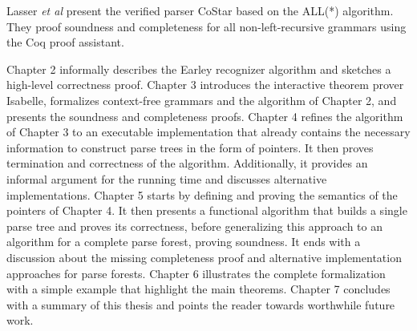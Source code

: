 \begin{isabellebody}
\begin{isamarkuptext}
Lasser \textit{et al} \cite{Lasser:2021} present the verified parser CoStar based on the ALL(*) algorithm.
They proof soundness and completeness for all non-left-recursive grammars using the Coq proof assistant.%
\end{isamarkuptext}\isamarkuptrue%
%
\isadelimdocument
%
\endisadelimdocument
%
\isatagdocument
%
\isamarkuptrue%
%
\endisatagdocument
{\isafolddocument}%
%
\isadelimdocument
%
\endisadelimdocument
%
\begin{isamarkuptext}%
Chapter 2 informally describes the Earley recognizer algorithm and sketches a high-level correctness proof.
Chapter 3 introduces the interactive theorem prover Isabelle, formalizes context-free grammars and the algorithm
  of Chapter 2, and presents the soundness and completeness proofs.
Chapter 4 refines the algorithm of Chapter 3 to an executable implementation that already contains the
  necessary information to construct parse trees in the form of pointers. It then proves termination and
  correctness of the algorithm. Additionally, it provides an informal argument for the running time and
  discusses alternative implementations.
Chapter 5 starts by defining and proving the semantics of the pointers of Chapter 4. It then presents
  a functional algorithm that builds a single parse tree and proves its correctness, before generalizing
  this approach to an algorithm for a complete parse forest, proving soundness. It ends with a discussion
  about the missing completeness proof and alternative implementation approaches for parse forests.
Chapter 6 illustrates the complete formalization with a simple example that highlight the main theorems.
Chapter 7 concludes with a summary of this thesis and points the reader towards worthwhile future work.%
\end{isamarkuptext}\isamarkuptrue%
%
\isadelimtheory
%
\endisadelimtheory
%
\isatagtheory
%
\endisatagtheory
{\isafoldtheory}%
%
\isadelimtheory
%
\endisadelimtheory
%
\end{isabellebody}%
\endinput
